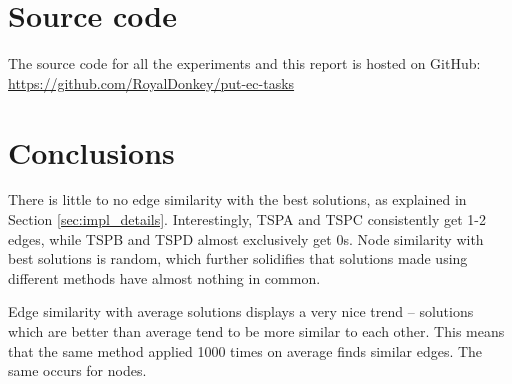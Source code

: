 \documentclass[14pt]{article}
\begin{document}
\section{Source code}
The source code for all the experiments and this report is hosted on GitHub: \\
\url{https://github.com/RoyalDonkey/put-ec-tasks}

\section{Conclusions}

There is little to no edge similarity with the best solutions, as explained in
Section \ref{sec:impl_details}. Interestingly, TSPA and TSPC consistently get
1-2 edges, while TSPB and TSPD almost exclusively get 0s. Node similarity with
best solutions is random, which further solidifies that solutions made using
different methods have almost nothing in common.

Edge similarity with average solutions displays a very nice trend -- solutions
which are better than average tend to be more similar to each other. This means
that the same method applied 1000 times on average finds similar edges. The
same occurs for nodes.
\end{document}
